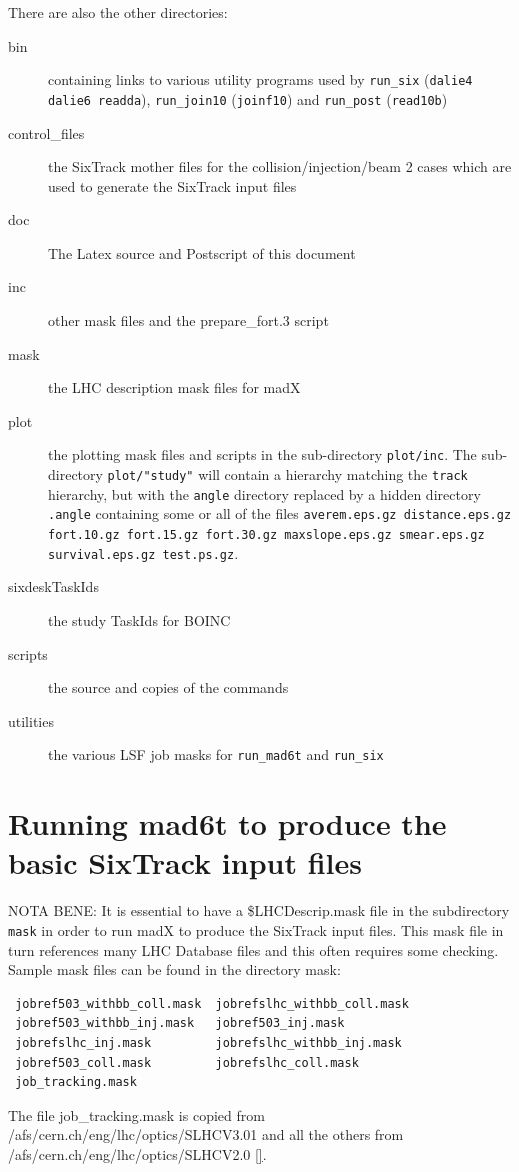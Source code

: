 \documentclass{article}    %
\begin{document}
There are also the other directories:
\begin{description}
\item [bin] containing links to various utility programs used by {\tt run\_six}
({\tt dalie4 dalie6 readda}), {\tt run\_join10} ({\tt joinf10})
and {\tt run\_post} ({\tt read10b})
\item [control\_files] the SixTrack mother files for the collision/injection/beam 2
cases which are used to generate the SixTrack input files
\item [doc] The Latex source and Postscript of this document
\item [inc] other mask files and the prepare\_fort.3 script
\item [mask] the LHC description mask files for madX 
\item [plot] the plotting mask files and scripts in the sub-directory {\tt plot/inc}.
The sub-directory {\tt plot/"study"} will contain a hierarchy matching the {\tt track}
hierarchy, but with the {\tt angle} directory replaced by a hidden directory {\tt .angle}  
containing some or all of the files {\tt averem.eps.gz distance.eps.gz fort.10.gz 
fort.15.gz fort.30.gz maxslope.eps.gz smear.eps.gz survival.eps.gz test.ps.gz}.
\item [sixdeskTaskIds] the study TaskIds for BOINC
\item [scripts] the source and copies of the commands
\item [utilities] the various LSF job masks for {\tt run\_mad6t} and {\tt run\_six}  
\end{description}
\section{Running mad6t to produce the basic SixTrack input files}
\label{sec:mad_6t}
NOTA BENE: It is essential to have a \$LHCDescrip.mask file
in the subdirectory {\tt mask} in order to run madX to produce
the SixTrack input files. This mask file in turn references many
LHC Database files and this often requires some checking.
Sample mask files can be found in the directory mask:
\begin{verbatim}
 jobref503_withbb_coll.mask  jobrefslhc_withbb_coll.mask  
 jobref503_withbb_inj.mask   jobref503_inj.mask        
 jobrefslhc_inj.mask         jobrefslhc_withbb_inj.mask
 jobref503_coll.mask         jobrefslhc_coll.mask        
 job_tracking.mask
\end{verbatim}
The file job\_tracking.mask is copied from
/afs/cern.ch/eng/lhc/optics/SLHCV3.01 and all the
others from /afs/cern.ch/eng/lhc/optics/SLHCV2.0 \ref{}.
\end{document}
